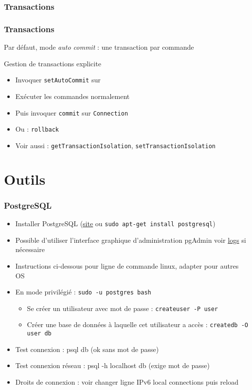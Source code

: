 \documentclass[english, french]{beamer}
\begin{document}
\subsubsection{Transactions}
\begin{frame}
	\frametitle{Transactions}
	Par défaut, mode \emph{auto commit} : une transaction par commande
	\begin{block}{Gestion de transactions explicite}
		\begin{itemize}
			\item Invoquer \texttt{setAutoCommit} sur 
			\item Exécuter les commandes normalement
			\item Puis invoquer \texttt{commit} sur \texttt{Connection}
			\item Ou : \texttt{rollback}
			\item Voir aussi : \texttt{getTransactionIsolation}, \texttt{setTransactionIsolation}
		\end{itemize}
	\end{block}
\end{frame}

\section{Outils}
\begin{frame}
	\frametitle{PostgreSQL}
	\begin{itemize}
		\item Installer PostgreSQL (\href{https://www.postgresql.org/}{site} {\tiny ou \texttt{sudo apt-get install postgresql}})
		\item Possible d’utiliser l’interface graphique d’administration pgAdmin {\tiny voir \href{https://wiki.postgresql.org/wiki/Troubleshooting_Installation\#Collect_the_installer_log_file}{logs} si nécessaire}
		\item Instructions ci-dessous pour ligne de commande linux, adapter pour autres OS
		\item En mode privilégié : \texttt{sudo -u postgres bash}
		\begin{itemize}
			\item Se créer un utilisateur avec mot de passe : \texttt{createuser -P user}
			\item Créer une base de données à laquelle cet utilisateur a accès : \texttt{createdb -O user db}
		\end{itemize}
		\item Test connexion : psql db (ok sans mot de passe)
		\item Test connexion réseau : psql -h localhost db (exige mot de passe)
		\item Droits de connexion : voir   {\tiny changer ligne IPv6 local connections puis reload}
	\end{itemize}
\end{frame}
\end{document}
